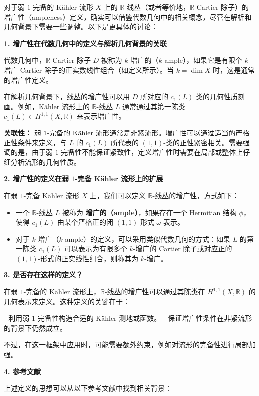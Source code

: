 \documentclass[lang=cn,zihao=-4,a4paper,fontset=none]{beautybook}
\begin{document}
\begin{solution}
     
对于弱 $1$-完备的 Kähler 流形 $X$ 上的 $\mathbb{R}$-线丛（或者等价地，$\mathbb{R}$-Cartier 除子）的增广性（ampleness）定义，确实可以借鉴代数几何中的相关概念，尽管在解析和几何背景下需要一些调整。以下是更具体的讨论：


 \textbf{1. 增广性在代数几何中的定义与解析几何背景的关联}

代数几何中，$\mathbb{R}$-Cartier 除子 $D$ 被称为 $k$-增广的（$k$-ample），如果它是有限个 $k$-增广 Cartier 除子的正实数线性组合（如定义所示）。当 $k = \dim X$ 时，这是通常的增广性定义。

在解析几何背景下，线丛的增广性可以用 $D$ 所对应的 $c_1(L)$ 类的几何性质刻画。例如，Kähler 流形上的 $\mathbb{R}$-线丛 $L$ 通常通过其第一陈类 $c_1(L) \in H^{1,1}(X, \mathbb{R})$ 来表示增广性。

 \textbf{关联性：  }
弱 $1$-完备的 Kähler 流形通常是非紧流形。增广性可以通过适当的严格正性条件来定义，与 $L$ 的 $c_1(L)$ 所代表的 $ (1,1) $-类的正性紧密相关。需要强调的是，由于弱 $1$-完备性不能保证紧致性，定义增广性时需要在局部或整体上仔细分析流形的几何性质。


 \textbf{2. 增广性的定义在弱 $1$-完备 Kähler 流形上的扩展}

在弱 $1$-完备 Kähler 流形 $X$ 上，我们可以定义 $\mathbb{R}$-线丛的增广性，方式如下：
\begin{itemize}
    \item  一个 $\mathbb{R}$-线丛 $L$ 被称为  \textbf{增广的（ample）}，如果存在一个 Hermitian 结构 $\phi$，使得 $c_1(L)$ 由某个严格正的闭 $(1,1)$-形式 $ \omega $ 表示。
    \item 对于 $k$-增广（$k$-ample）的定义，可以采用类似代数几何的方式：如果 $L$ 的第一陈类 $c_1(L)$ 可以表示为有限多个 $k$-增广的 Cartier 除子或对应正的 $(1,1)$-形式的正实线性组合，则称其为 $k$-增广。
\end{itemize}

 \textbf{3. 是否存在这样的定义？}

在弱 $1$-完备的 Kähler 流形上，$\mathbb{R}$-线丛的增广性可以通过其陈类在 $H^{1,1}(X, \mathbb{R})$ 的几何表示来定义。这种定义的关键在于：

- 利用弱 $1$-完备性构造合适的 Kähler 测地或函数。
- 保证增广性条件在非紧流形的背景下仍然成立。

不过，在这一框架中应用时，可能需要额外约束，例如对流形的完备性进行局部加强。


 \textbf{4. 参考文献}

上述定义的思想可以从以下参考文献中找到相关背景：


\end{solution}
\end{document}
